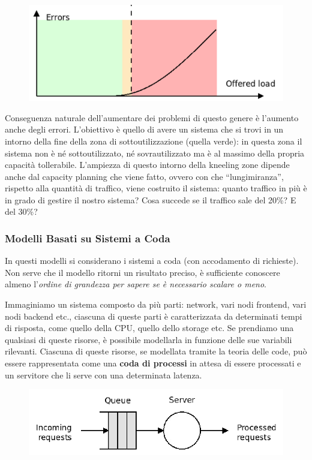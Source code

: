 \documentclass{article}
\begin{document}
		\begin{figure}[ht]
			\centering
			\includegraphics[width=0.7\linewidth]{SAC_D1_load3}
			\label{fig:sacd1load3}
		\end{figure}
		
		Conseguenza naturale dell’aumentare dei problemi di questo genere è l'aumento anche degli errori.
		L’obiettivo è quello di avere un sistema che si trovi in un intorno della fine della zona di sottoutilizzazione (quella verde): in questa zona il sistema non è né sottoutilizzato, né sovrautilizzato ma è al massimo della propria capacità tollerabile.
		L’ampiezza di questo intorno della kneeling zone dipende anche dal
		capacity planning che viene fatto, ovvero con che “lungimiranza”, rispetto alla quantità di traffico, viene costruito il sistema: quanto traffico in più è in grado di gestire il nostro sistema? Cosa succede se il traffico sale del 20\%? E del 30\%?
		
		
		\subsubsection{Modelli Basati su Sistemi a
			Coda}\label{modelli-basati-su-sistemi-a-coda}
		
		
		In questi modelli si considerano i sistemi a coda (con
		accodamento di richieste). Non serve che il modello ritorni un
		risultato preciso, è sufficiente conoscere almeno l'\emph{ordine di grandezza	per sapere se è necessario scalare o meno}.
		
		Immaginiamo un sistema composto da più parti: network, vari nodi frontend, vari nodi backend etc., ciascuna di queste parti è caratterizzata da determinati tempi di risposta, come quello della CPU, quello dello storage etc.
		Se prendiamo una qualsiasi di queste risorse, è possibile modellarla in funzione delle sue variabili
		rilevanti. Ciascuna di queste risorse, se modellata tramite la
		teoria delle code, può essere rappresentata come una \textbf{coda di processi } in attesa di essere
		processati e un servitore che li serve con una determinata latenza.
		
		\begin{figure}[ht]
			\centering
			\includegraphics[width=0.7\linewidth]{images/SAC_D1_queue}
		\end{figure}
		
\end{document}
